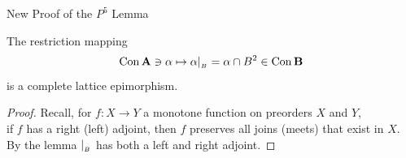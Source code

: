 \begin{frame}[fragile,label=P5Lemma]{New Proof of the $P^5$ Lemma}
  \begin{lemma}
The restriction mapping 
\[
\mathrm{Con\,}\mathbf{A} \ni \alpha \mapsto \alpha|_{_B} = \alpha \cap B^2 \in \mathrm{Con\,} \mathbf{B}
\]
is a complete lattice epimorphism. %
  \end{lemma}
\begin{proof}
  Recall, for $f: X \to Y$ a monotone function on preorders $X$ and $Y$,\\
  if $f$ has a right (left) adjoint, then $f$ preserves all joins (meets)
  that exist in $X$.\\[5pt]
  By the lemma $|_{_B}$ has both a left and right adjoint.
\end{proof}
\end{frame}













































